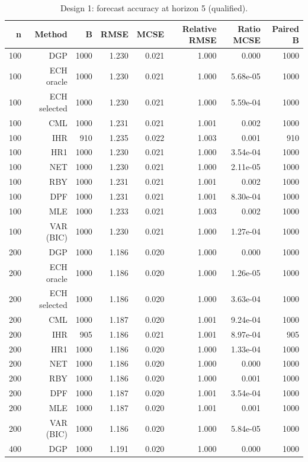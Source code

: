 \begin{table}[p]\centering
\caption{Design 1: forecast accuracy at horizon 5 (qualified).}
\small
\begin{tabular}{rrrrrrrr}\toprule
n & Method & B & RMSE & MCSE & Relative RMSE & Ratio MCSE & Paired B \\\midrule
100 & DGP & 1000 & 1.230 & 0.021 & 1.000 & 0.000 & 1000 \\
100 & ECH oracle & 1000 & 1.230 & 0.021 & 1.000 & 5.68e-05 & 1000 \\
100 & ECH selected & 1000 & 1.230 & 0.021 & 1.000 & 5.59e-04 & 1000 \\
100 & CML & 1000 & 1.231 & 0.021 & 1.001 & 0.002 & 1000 \\
100 & IHR &  910 & 1.235 & 0.022 & 1.003 & 0.001 &  910 \\
100 & HR1 & 1000 & 1.230 & 0.021 & 1.000 & 3.54e-04 & 1000 \\
100 & NET & 1000 & 1.230 & 0.021 & 1.000 & 2.11e-05 & 1000 \\
100 & RBY & 1000 & 1.231 & 0.021 & 1.001 & 0.002 & 1000 \\
100 & DPF & 1000 & 1.231 & 0.021 & 1.001 & 8.30e-04 & 1000 \\
100 & MLE & 1000 & 1.233 & 0.021 & 1.003 & 0.002 & 1000 \\
100 & VAR (BIC) & 1000 & 1.230 & 0.021 & 1.000 & 1.27e-04 & 1000 \\
200 & DGP & 1000 & 1.186 & 0.020 & 1.000 & 0.000 & 1000 \\
200 & ECH oracle & 1000 & 1.186 & 0.020 & 1.000 & 1.26e-05 & 1000 \\
200 & ECH selected & 1000 & 1.186 & 0.020 & 1.000 & 3.63e-04 & 1000 \\
200 & CML & 1000 & 1.187 & 0.020 & 1.001 & 9.24e-04 & 1000 \\
200 & IHR &  905 & 1.186 & 0.021 & 1.001 & 8.97e-04 &  905 \\
200 & HR1 & 1000 & 1.186 & 0.020 & 1.000 & 1.33e-04 & 1000 \\
200 & NET & 1000 & 1.186 & 0.020 & 1.000 & 0.000 & 1000 \\
200 & RBY & 1000 & 1.186 & 0.020 & 1.000 & 0.001 & 1000 \\
200 & DPF & 1000 & 1.187 & 0.020 & 1.001 & 3.54e-04 & 1000 \\
200 & MLE & 1000 & 1.187 & 0.020 & 1.001 & 0.001 & 1000 \\
200 & VAR (BIC) & 1000 & 1.186 & 0.020 & 1.000 & 5.84e-05 & 1000 \\
400 & DGP & 1000 & 1.191 & 0.020 & 1.000 & 0.000 & 1000 \\

\end{tabular}
\end{table}
